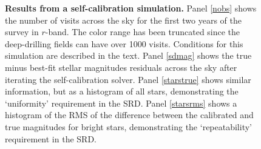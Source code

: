 \documentclass[12pt,preprint]{aastex}
\begin{document}
\begin{figure}
{\begin{minipage}{6.5in}
\caption{{\small {\bf Results from a self-calibration simulation.}
Panel \ref{nobs} shows the number of visits across the sky for the
first two years of the survey in $r$-band.  The color range has been
truncated since the deep-drilling fields can have over 1000 visits.
Conditions for this simulation are described in the text.  Panel
\ref{sdmag} shows the true minus best-fit stellar magnitudes residuals
across the sky after iterating the self-calibration solver. Panel
\ref{starstrue} shows similar information, but as a histogram of all
stars, demonstrating the `uniformity' requirement in the SRD. Panel
\ref{starsrms} shows a histogram of the RMS of the difference between
the calibrated and true magnitudes for bright stars, demonstrating the
`repeatability' requirement in the SRD.  }}
\label{fig:selfcal_fiducial}
\end{minipage}
}
\end{figure}
\end{document}
